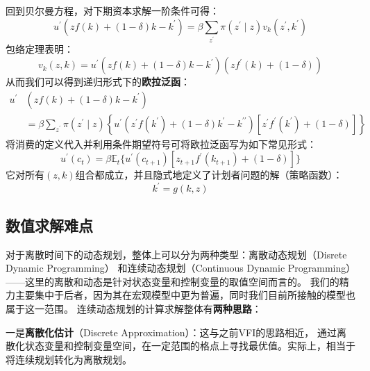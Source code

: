 回到贝尔曼方程，对下期资本求解一阶条件可得：
\begin{equation}    \label{eq-s-opt-growth-foc-dp}
    u^{\prime}\left(zf(k)+(1-\delta)k-k^{\prime}\right)
        = \beta\sum_{z^{\prime}}\pi\left(z^{\prime} \mid z\right)v_k\left(z^{\prime},k^{\prime}\right)
\end{equation}
包络定理表明：
\begin{equation}
    v_k\left(z,k\right) 
        = u^{\prime}\left(zf(k)+(1-\delta)k-k^{\prime}\right)\left(zf^{\prime}(k)+\left(1-\delta\right)\right)
\end{equation}
从而我们可以得到递归形式下的\textbf{欧拉泛函}：
\begin{equation}    \label{eq-s-opt-growth-euler-dp}
    \begin{aligned}
        u^{\prime}&\left(zf(k) + (1-\delta)k-k^{\prime}\right) \\
            &= \beta\sum_{z^{\prime}}\pi\left(z^{\prime}\mid z\right)
                \left\{u^{\prime}\left(z^{\prime}f(k^{\prime})+(1-\delta)k^{\prime}-k^{\prime\prime}\right)
                    \left[z^{\prime}f^{\prime}\left(k^{\prime}\right)+\left(1-\delta\right)\right]\right\}
    \end{aligned}
\end{equation}
将消费的定义代入并利用条件期望符号可将欧拉泛函写为如下常见形式：
\begin{equation*}
    u^{\prime}(c_t) = 
        \beta \mathbb{E}_t\{u^{\prime}(c_{t+1})\left[z_{t+1}f^{\prime}(k_{t+1})+\left(1-\delta\right)\right]\}
\end{equation*}
它对所有$(z,k)$组合都成立，并且隐式地定义了计划者问题的解（策略函数）：
\begin{equation*}
    k^{\prime} = g\left(k,z\right)
\end{equation*}


\subsection{数值求解难点}

对于离散时间下的动态规划，整体上可以分为两种类型：离散动态规划（Disrete Dynamic Programming）
和连续动态规划（Continuous Dynamic Programming）——这里的离散和动态是针对状态变量和控制变量的取值空间而言的。
我们的精力主要集中于后者，因为其在宏观模型中更为普遍，同时我们目前所接触的模型也属于这一范围。
连续动态规划的计算求解整体有\textbf{两种思路}：

一是\textbf{离散化估计}（Discrete Approximation）：这与之前VFI的思路相近，
通过离散化状态变量和控制变量空间，在一定范围的格点上寻找最优值。实际上，相当于将连续规划转化为离散规划。

